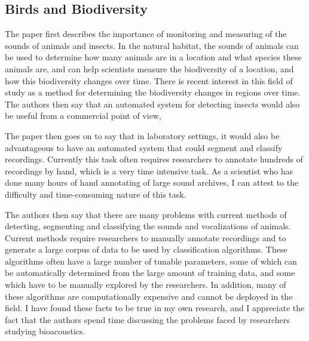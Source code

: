 \documentclass[12pt,oneside]{book}
\begin{document}
\subsection{Birds and Biodiversity}


The paper first describes the importance of monitoring and measuring
of the sounds of animals and insects.  In the natural habitat, the
sounds of animals can be used to determine how many animals are in a
location and what species these animals are, and can help scientists
measure the biodiversity of a location, and how this biodiversity
changes over time.  There is recent interest in this field of study
\cite{wimmer2010} \cite{seuer2008} as a method for determining the
biodiversity changes in regions over time.  The authors then say that
an automated system for detecting insects would also be useful from a
commercial point of view,

The paper then goes on to say that in laboratory settings, it would
also be advantageous to have an automated system that could segment
and classify recordings.  Currently this task often requires
researchers to annotate hundreds of recordings by hand, which is a
very time intensive task.  As a scientist who has done many hours of
hand annotating of large sound archives, I can attest to the
difficulty and time-consuming nature of this task.

The authors then say that there are many problems with current methods
of detecting, segmenting and classifying the sounds and vocalizations
of animals.  Current methods require researchers to manually annotate
recordings and to generate a large corpus of data to be used by
classification algorithms.  These algorithms often have a large number
of tunable parameters, some of which can be automatically determined
from the large amount of training data, and some which have to be
manually explored by the researchers.  In addition, many of these
algorithms are computationally expensive and cannot be deployed in the
field.  I have found these facts to be true in my own research, and I
appreciate the fact that the authors spend time discussing the
problems faced by researchers studying bioacoustics.
\end{document}
